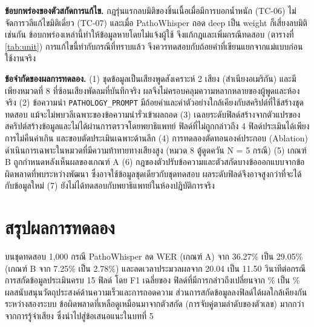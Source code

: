 \textbf{ข้อบกพร่องของตัวสกัดการแก้ไข.} กฎรุ่นแรกลบมิติของชิ้นเนื้อเมื่อมีการบอกน้ำหนัก (TC-06) ไม่จัดการวลีแก้ไขมิติเดี่ยว (TC-07) และเมื่อ PathoWhisper ถอด deep เป็น weight ก็เสี่ยงลบมิติเช่นกัน ข้อบกพร่องเหล่านี้ทำให้ข้อมูลหายโดยไม่แจ้งผู้ใช้ จึงแก้กฎและเพิ่มกรณีทดสอบ (ตารางที่ \ref{tab:unit}) การแก้ไขนี้ทำกับกรณีที่ทราบแล้ว จึงควรทดสอบกับถ้อยคำที่เขียนแยกจากแม่แบบก่อนใช้งานจริง

\textbf{ข้อจำกัดของผลการทดลอง.} (1) ชุดข้อมูลเป็นเสียงพูดสังเคราะห์ 2 เสียง (สำเนียงอเมริกัน) และมีเพียงหมวดที่ 8 ที่ซ้อนเสียงพัดลมที่บันทึกจริง ผลจึงไม่ครอบคลุมความหลากหลายของผู้พูดและห้องจริง (2) ข้อความนำ \texttt{PATHOLOGY\_PROMPT} มีถ้อยคำและค่าตัวอย่างใกล้เคียงกับสคริปต์ที่ใช้สร้างชุดทดสอบ แม้จะไม่พบวลีเฉพาะของข้อความนำรั่วเข้าผลถอด (3) เฉลยระดับฟิลด์สร้างจากตัวแปรของสคริปต์สร้างข้อมูลและไม่ได้ผ่านการตรวจโดยพยาธิแพทย์ ฟิลด์ที่ไม่ถูกกล่าวถึง 4 ฟิลด์ประเมินได้เพียงการไม่คืนค่าเกิน และขอบตัดประเมินเฉพาะด้านลึก (4) การทดลองตัดทอนองค์ประกอบ (Ablation) ดำเนินการเฉพาะในหมวดที่มีความท้าทายทางเสียงสูง (หมวด 8 ตู้ดูดควัน N = 5 กรณี) (5) เกณฑ์ B ถูกกำหนดหลังเห็นผลของเกณฑ์ A (6) กฎของตัวปรับข้อความและตัวสกัดบางข้อออกแบบจากข้อผิดพลาดที่พบระหว่างพัฒนา ซึ่งอาจใช้ข้อมูลชุดเดียวกับชุดทดสอบ ผลระดับฟิลด์จึงอาจสูงกว่าที่จะได้กับข้อมูลใหม่ (7) ยังไม่ได้ทดสอบกับพยาธิแพทย์ในห้องปฏิบัติการจริง

\section{สรุปผลการทดลอง}

บนชุดทดสอบ 1,000 กรณี PathoWhisper ลด WER (เกณฑ์ A) จาก 36.27\% เป็น 29.05\% (เกณฑ์ B จาก 7.25\% เป็น 2.78\%) และลดเวลาประมวลผลจาก 20.04 เป็น 11.50 วินาทีต่อกรณี การสกัดข้อมูลประเมินครบ 15 ฟิลด์ โดย F1 เฉลี่ยของ \nSpoken{} ฟิลด์ที่มีการกล่าวถึงเปลี่ยนจาก \MacroBase\% เป็น \MacroPW\% ผลสนับสนุนวัตถุประสงค์ด้านความเร็วและการถอดความ ส่วนการสกัดข้อมูลลงฟิลด์ได้ผลใกล้เคียงกันระหว่างสองระบบ ข้อผิดพลาดที่เหลือดูเหมือนมาจากตัวสกัด (การจับคู่ตามลำดับของตัวเลข) มากกว่าจากการรู้จำเสียง ซึ่งนำไปสู่ข้อเสนอแนะในบทที่ 5
